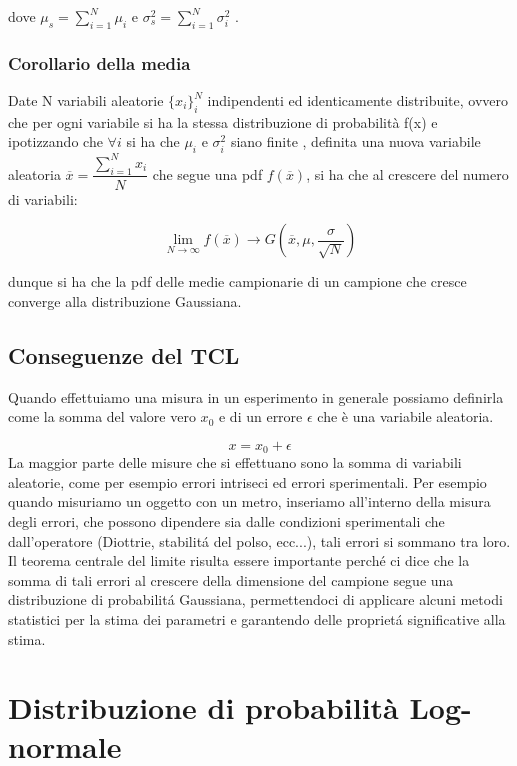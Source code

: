 dove $\mu_s =\sum_{i=1}^N \mu_i$ e $\sigma_s^2 = \sum_{i=1}^N \sigma^2_i$ .

\subsubsection{Corollario della media}

Date N variabili aleatorie $\{x_{i}\}_{i}^N$ indipendenti ed identicamente distribuite, ovvero che per ogni variabile si ha la stessa distribuzione di probabilit\`{a} f(x) e ipotizzando che $\forall i$ si ha che $\mu_i$ e $\sigma_i^2$ siano finite , definita una nuova variabile aleatoria $\overline{x} = \dfrac{\sum_{i=1}^N x_{i}}{N}$ che segue una pdf $f(\overline{x})$, si ha che al crescere del numero di variabili:

\begin{equation*}
	\lim_{N \rightarrow \infty} f(\overline{x}) \rightarrow G(\overline{x},\mu,\frac{\sigma}{\sqrt{N}})
\end{equation*}

dunque si ha che la pdf delle medie campionarie di un campione che cresce converge alla distribuzione Gaussiana.


\subsection{Conseguenze del TCL}

 Quando effettuiamo una misura in un esperimento in generale possiamo definirla come la somma del valore vero $x_0$ e di un errore $\epsilon$ che \`{e} una variabile aleatoria. 
 
 \begin{equation*}
 	x = x_0 + \epsilon
 \end{equation*}
La maggior parte delle misure che si effettuano sono la somma di variabili aleatorie, come per esempio errori intriseci ed errori sperimentali. Per esempio quando misuriamo un oggetto con un metro, inseriamo all'interno della misura degli errori, che possono dipendere sia dalle condizioni sperimentali che dall'operatore (Diottrie, stabilit\'{a} del polso, ecc...), tali errori si sommano tra loro. Il teorema centrale del limite risulta essere importante perch\'{e} ci dice che la somma di tali errori al crescere della dimensione del campione segue una distribuzione di probabilit\'{a} Gaussiana, permettendoci di applicare alcuni metodi statistici per la stima dei parametri e garantendo delle propriet\'{a} significative alla stima.

\section{Distribuzione di probabilit\`{a} Log-normale}

